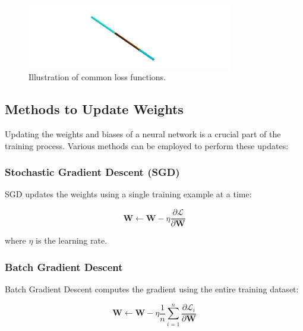 \documentclass{report}
\begin{document}
            \begin{figure}[h]
                \centering
                \includegraphics[width=0.8\textwidth]{00_Images/00_Velocity.png}
                \caption{Illustration of common loss functions.}
                \label{fig:loss_functions}
            \end{figure}
            
            \subsection{Methods to Update Weights}
            
            Updating the weights and biases of a neural network is a crucial part of the training process. Various methods can be employed to perform these updates:
            
            \subsubsection{Stochastic Gradient Descent (SGD)}
            
            SGD updates the weights using a single training example at a time:
            
            \begin{equation}
            \mathbf{W} \leftarrow \mathbf{W} - \eta \frac{\partial \mathcal{L}}{\partial \mathbf{W}}
            \end{equation}
            
            where \( \eta \) is the learning rate.
            
            \subsubsection{Batch Gradient Descent}
            
            Batch Gradient Descent computes the gradient using the entire training dataset:
            
            \begin{equation}
            \mathbf{W} \leftarrow \mathbf{W} - \eta \frac{1}{n} \sum_{i=1}^n \frac{\partial \mathcal{L}_i}{\partial \mathbf{W}}
            \end{equation}
            
\end{document}
